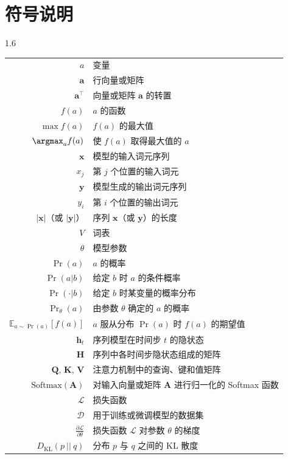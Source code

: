 \chapter*{符号说明}

\vspace{1.5em}

\begin{spacing}{1.6}
\begin{center}
\begin{tabular}{r p{}}
$a$ & 变量 \\
$\mathbf{a}$ & 行向量或矩阵 \\
$\mathbf{a}^\top$ & 向量或矩阵 $\mathbf{a}$ 的转置 \\
$f(a)$ & $a$ 的函数 \\
$\max f(a)$ & $f(a)$ 的最大值 \\
$\argmax_{a} f(a)$ & 使 $f(a)$ 取得最大值的 $a$ \\
$\mathbf{x}$ & 模型的输入词元序列 \\
$x_j$ & 第 $j$ 个位置的输入词元 \\
$\mathbf{y}$ & 模型生成的输出词元序列 \\
$y_i$ & 第 $i$ 个位置的输出词元 \\
$|\mathbf{x}|$（或 $|\mathbf{y}|$） & 序列 $\mathbf{x}$（或 $\mathbf{y}$）的长度  \\
$V$ & 词表 \\
$\theta$ & 模型参数 \\
$\Pr(a)$ & $a$ 的概率 \\
$\Pr(a|b)$ & 给定 $b$ 时 $a$ 的条件概率 \\
$\Pr(\cdot|b)$ & 给定 $b$ 时某变量的概率分布 \\
$\Pr_{\theta}(a)$ &  由参数 $\theta$ 确定的 $a$ 的概率 \\
$\mathbb{E}_{a\sim \Pr(a)}[f(a)]$ & $a$ 服从分布 $\Pr(a)$ 时 $f(a)$ 的期望值 \\
$\mathbf{h}_t$ & 序列模型在时间步 $t$ 的隐状态 \\
$\mathbf{H}$ & 序列中各时间步隐状态组成的矩阵 \\
$\mathbf{Q}$, $\mathbf{K}$, $\mathbf{V}$ & 注意力机制中的查询、键和值矩阵 \\
$\mathrm{Softmax}(\mathbf{A})$ & 对输入向量或矩阵 $\mathbf{A}$ 进行归一化的 Softmax 函数 \\
$\mathcal{L}$ & 损失函数 \\
$\mathcal{D}$ & 用于训练或微调模型的数据集 \\
$\frac{\partial \mathcal{L}}{\partial \theta}$ & 损失函数 $\mathcal{L}$ 对参数 $\theta$ 的梯度 \\
$D_{\mathrm{KL}}(p\ ||\ q)$ & 分布 $p$ 与 $q$ 之间的 KL 散度
\end{tabular}
\end{center}
\end{spacing}
